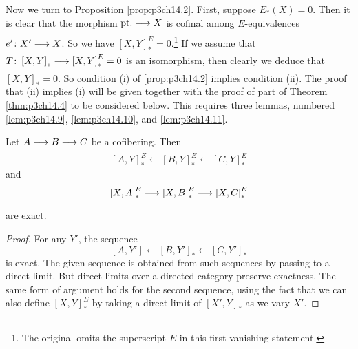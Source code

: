 \documentclass[../main]{subfiles}
\begin{document}
Now we turn to Proposition \ref{prop:p3ch14.2}. First, suppose $E_{\ast}(X)=0$. Then it is clear that the morphism $\te{pt}. \lar{} X$ is cofinal among $E$-equivalences $e'\colon X' \lar{} X$. So we have $\left[X,Y\right]^E_{\ast}=0$.\footnote{The original omits the superscript $E$ in this first vanishing statement.} If we assume that $T\colon \left[X,Y\right]_{\ast} \lar{} \left[X,Y\right]^E_{\ast}=0$ is an isomorphism, then clearly we deduce that $\left[X,Y\right]_{\ast}=0$. So condition (i) of \ref{prop:p3ch14.2} implies condition (ii). The proof that (ii) implies (i) will be given together with the proof of part of Theorem \ref{thm:p3ch14.4} to be considered below. This requires three lemmas, numbered \ref{lem:p3ch14.9}, \ref{lem:p3ch14.10}, and \ref{lem:p3ch14.11}.
\begin{lemma} \label{lem:p3ch14.9}
Let $A \lar{} B \lar{} C$ be a cofibering. Then
\[
  \left[A,Y\right]^E_{\ast} \longleftarrow \left[B,Y\right]^E_{\ast} \longleftarrow \left[C,Y\right]^E_{\ast}
\] 
and
\[
  \left[X,A\right]^E_{\ast} \lar{} \left[X,B\right]^E_{\ast} \lar{}  \left[X,C\right]^E_{\ast}
\] 
are exact.
\begin{proof} 
   For any $Y'$, the sequence 
   \[
     \left[A,Y'\right] \longleftarrow \left[B,Y'\right]_{\ast} \longleftarrow \left[C,Y'\right]_{\ast}
   \] 
   is exact. The given sequence is obtained from such sequences by passing to a direct limit. But direct limits over a directed category preserve exactness. The same form of argument holds for the second sequence, using the fact that we can also define $ \left[X,Y\right]^E_{\ast}$ by taking a direct limit of $ \left[X',Y\right]_{\ast}$ as we vary $X'$.
\end{proof}
\end{lemma}
\end{document}
